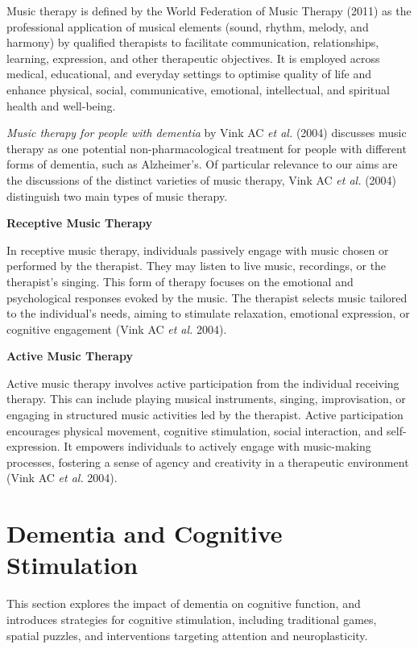 \documentclass{l4proj}
\begin{document}
Music therapy is defined by the World Federation of Music Therapy (2011) as the professional application of musical elements (sound, rhythm, melody, and harmony) by qualified therapists to facilitate communication, relationships, learning, expression, and other therapeutic objectives. It is employed across medical, educational, and everyday settings to optimise quality of life and enhance physical, social, communicative, emotional, intellectual, and spiritual health and well-being.

\emph{Music therapy for people with dementia} by Vink AC \emph{et al.} (2004) discusses music therapy as one potential non-pharmacological treatment for people with different forms of dementia, such as Alzheimer's. Of particular relevance to our aims are the discussions of the distinct varieties of music therapy, Vink AC \emph{et al.} (2004) distinguish two main types of music therapy.
\newline

\textbf{Receptive Music Therapy}
\newline

In receptive music therapy, individuals passively engage with music chosen or performed by the therapist. They may listen to live music, recordings, or the therapist's singing. This form of therapy focuses on the emotional and psychological responses evoked by the music. The therapist selects music tailored to the individual's needs, aiming to stimulate relaxation, emotional expression, or cognitive engagement (Vink AC \emph{et al.} 2004).
\newline

\textbf{Active Music Therapy}
\newline

Active music therapy involves active participation from the individual receiving therapy. This can include playing musical instruments, singing, improvisation, or engaging in structured music activities led by the therapist. Active participation encourages physical movement, cognitive stimulation, social interaction, and self-expression. It empowers individuals to actively engage with music-making processes, fostering a sense of agency and creativity in a therapeutic environment (Vink AC \emph{et al.} 2004).


\section{Dementia and Cognitive Stimulation}
This section explores the impact of dementia on cognitive function, and introduces strategies for cognitive stimulation, including traditional games, spatial puzzles, and interventions targeting attention and neuroplasticity.
\end{document}
